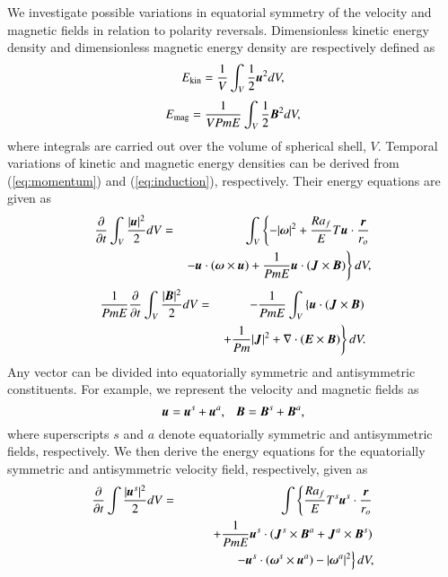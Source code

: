 We investigate possible variations in equatorial symmetry of the velocity and magnetic fields in relation to polarity reversals.
Dimensionless kinetic energy density and dimensionless magnetic energy density are respectively defined as
%
\begin{equation}
E_{\rm kin} = \frac{1}{V}
  \int_V \frac{1}{2} \mbox{\boldmath$u$}^2 d V ,
\label{eq:Ekin}
\end{equation}
%
\begin{equation}
E_{\rm mag} = \frac{1}{V Pm E}
  \int_V \frac{1}{2} \mbox{\boldmath$B$}^2 d V ,
\label{eq:Emag}
\end{equation}
%
where integrals are carried out over the volume of spherical shell, $V$.
Temporal variations of kinetic and magnetic energy densities can be derived from (\ref{eq:momentum}) and (\ref{eq:induction}), respectively.
Their energy equations are given as
%
\begin{eqnarray}
\frac{\partial}{\partial t}
 \int_V \frac{|\mbox{\boldmath$u$}|^2}{2} d V
 &=& \int_V \left\{
    - |\mbox{\boldmath$\omega$}|^2 
    + \frac{Ra_f}{E}T \mbox{\boldmath$u$}\cdot 
    \frac{\mbox{\boldmath$r$}}{r_o}
      \right.
\nonumber \\
 & & \left.
    - \mbox{\boldmath$u$} \cdot (\mbox{\boldmath$\omega$}\times\mbox{\boldmath$u$})
    + \frac{1}{Pm E} \mbox{\boldmath$u$} \cdot
                     (\mbox{\boldmath$J$} \times \mbox{\boldmath$B$})
      \right\} d V,
\label{eq:energy_u}
\end{eqnarray}
%
\begin{eqnarray}
\frac{1}{Pm E}\frac{\partial}{\partial t}
 \int_V \frac{|\mbox{\boldmath$B$}|^2}{2} d V
  & = & 
- \frac{1}{Pm E}\int_V \left\{
      \mbox{\boldmath$u$} \cdot ( \mbox{\boldmath$J$} \times \mbox{\boldmath$B$} )
\right. \nonumber \\
 & &    \left.
    + \frac{1}{Pm} |\mbox{\boldmath$J$}|^2
    + \nabla \cdot ( \mbox{\boldmath$E$} \times \mbox{\boldmath$B$} ) 
      \right\} d V.
\label{eq:energy_B}
\end{eqnarray}
%
Any vector can be divided into equatorially symmetric and antisymmetric constituents.
{\color{teal}
For example, 
}
we represent the velocity and magnetic fields as
%
\begin{equation}
\mbox{\boldmath$u$} = \mbox{\boldmath$u$}^s + \mbox{\boldmath$u$}^a, ~~~
\mbox{\boldmath$B$} = \mbox{\boldmath$B$}^s + \mbox{\boldmath$B$}^a,
\label{eq:eqas}
\end{equation}
%
where superscripts $s$ and $a$ denote equatorially symmetric and antisymmetric fields, respectively.
We then derive the energy equations for the equatorially symmetric and antisymmetric velocity field, respectively, given as
%
\begin{eqnarray}
\displaystyle
\frac{\partial}{\partial t}
 \int \frac{|\mbox{\boldmath$u$}^s|^2}{2} d V 
 &=& \int \left\{
      \frac{Ra_f}{E}T^s \mbox{\boldmath$u$}^s\cdot \frac{\mbox{\boldmath$r$}}{r_{o}}
     \right.
\nonumber \\
& & \displaystyle
\hspace*{2em}
     \left.
    + \frac{1}{Pm E} \mbox{\boldmath$u$}^s \cdot
                (\mbox{\boldmath$J$}^s \times \mbox{\boldmath$B$}^a
                +\mbox{\boldmath$J$}^a \times \mbox{\boldmath$B$}^s)
      \right.
\nonumber \\
& &\displaystyle
\hspace*{3em}
      \left.
    - \mbox{\boldmath$u$}^s \cdot 
       (\mbox{\boldmath$\omega$}^s \times \mbox{\boldmath$u$}^a)
    - |\mbox{\boldmath$\omega$}^a|^2 
      \right\} d V,
\label{eq:energy_us}
\end{eqnarray}
